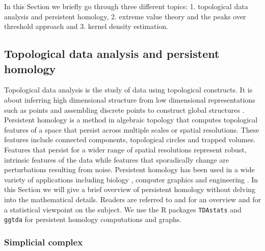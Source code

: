 \documentclass[11pt,a4paper,]{article}
\theoremstyle{definition}
\theoremstyle{definition}
\theoremstyle{definition}
\theoremstyle{remark}
\begin{document}
In this Section we briefly go through three different topics:
1. topological data analysis and persistent homology,
2. extreme value theory and the peaks over threshold approach and
3. kernel density estimation.

\hypertarget{topological-data-analysis-and-persistent-homology}{%
\subsection{\texorpdfstring{Topological data analysis and persistent homology \label{subsec:tda}}{Topological data analysis and persistent homology }}\label{topological-data-analysis-and-persistent-homology}}

Topological data analysis is the study of data using topological constructs. It is about inferring high dimensional structure from low dimensional representations such as points and assembling discrete points to construct global structures \autocite{ghrist2008barcodes}. Persistent homology is a method in algebraic topology that computes topological features of a space that persist across multiple scales or spatial resolutions. These features include connected components, topological circles and trapped volumes. Features that persist for a wider range of spatial resolutions represent robust, intrinsic features of the data while features that sporadically change are perturbations resulting from noise. Persistent homology has been used in a wide variety of applications including biology \autocite{topaz2015topological}, computer graphics \autocite{carlsson2008local} and engineering \autocite{perea2015sliding}. In this Section we will give a brief overview of persistent homology without delving into the mathematical details. Readers are referred to \textcite{ghrist2008barcodes} and \textcite{Carlsson2009} for an overview and \textcite{wasserman2018topological} for a statistical viewpoint on the subject. We use the R packages \texttt{TDAstats} and \texttt{ggtda} for persistent homology computations and graphs.

\hypertarget{simplicial-complex}{%
\subsubsection{\texorpdfstring{Simplicial complex \label{subsubsec:simplicialcomplex}}{Simplicial complex }}\label{simplicial-complex}}
\end{document}
